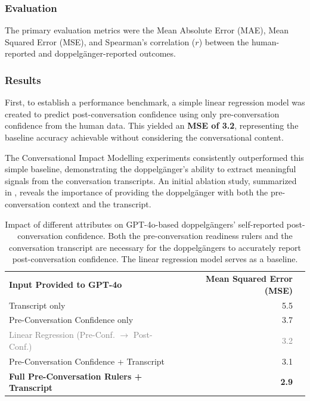 \subsubsection{Evaluation}
The primary evaluation metrics were the Mean Absolute Error (MAE), Mean Squared Error (MSE), and Spearman's correlation ($r$) between the human-reported and doppelgänger-reported outcomes.

\subsubsection{Results}
First, to establish a performance benchmark, a simple linear regression model was created to predict post-conversation confidence using only pre-conversation confidence from the human data. This yielded an \textbf{MSE of 3.2}, representing the baseline accuracy achievable without considering the conversational content.

The Conversational Impact Modelling experiments consistently outperformed this simple baseline, demonstrating the doppelgänger's ability to extract meaningful signals from the conversation transcripts. An initial ablation study, summarized in , reveals the importance of providing the doppelgänger with both the pre-conversation context and the transcript.



\begin{table}[ht!]
\centering
\begin{tabular}{@{}lrr@{}}
\cmidrule(r){1-2}
\textbf{Input Provided to GPT-4o} & \textbf{Mean Squared Error (MSE)} & \\
\cmidrule(r){1-2}
Transcript only & 5.5 & \\
Pre-Conversation Confidence only & 3.7 & \\
\textcolor{gray}{Linear Regression (Pre-Conf. $\rightarrow$ Post-Conf.)} & \textcolor{gray}{3.2} & \\
Pre-Conversation Confidence + Transcript & 3.1 & \\
\textbf{Full Pre-Conversation Rulers + Transcript} & \textbf{2.9} & \\
\cmidrule(r){1-2}
\end{tabular}
\caption[Ablation study on doppelgängers' self-reported post-conversation confidence]{Impact of different attributes on GPT-4o-based doppelgängers' self-reported post-conversation confidence. Both the pre-conversation readiness rulers and the conversation transcript are necessary for the doppelgängers to accurately report post-conversation confidence. The linear regression model serves as a baseline.}
\label{tab:ablation_results}
\end{table}




